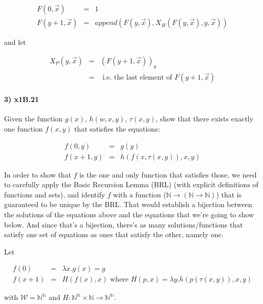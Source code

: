 \documentclass{article}
\begin{document}
\[
\begin{array}{rcl}
  F(0, \overrightarrow{x}) & = & 1 \\
  F(y+1, \overrightarrow{x}) & = & append(F(y,\overrightarrow{x}), X_H(F(y,\overrightarrow{x}), y, \overrightarrow{x}))
\end{array}
\]

and let

\[
\begin{array}{rcl}
  X_P(y, \overrightarrow{x}) & = & (F(y+1,\overrightarrow{x}))_y \\
  & = & \text{ i.e. the last element of } F(y+1,\overrightarrow{x})
\end{array} 
\]



\paragraph{3) x1B.21} Given the function $g(x)$, $h(w,x,y)$, $\tau (x,y)$, show that there exists exactly one function $f(x,y)$ that satisfies the equations:

\[
\begin{array}{rcl}
  f(0,y) & = & g(y) \\
  f(x + 1, y) & = & h(f(x,\tau (x,y)), x, y)
\end{array} 
\]

In order to show that $f$ is the one and only function that satisfies
those, we need to carefully apply the Basic Recursion Lemma (BRL)
(with explicit definitions of functions and sets), and identify $f$
with a function ($\mathbb{N} \rightarrow (\mathbb{N} \rightarrow
\mathbb{N})$) that is guaranteed to be unique by the BRL. That would
establish a bijection between the solutions of the equations above and
the equations that we're going to show below. And since that's a
bijection, there's as many solutions/functions that satisfy one set of
equations as ones that satisfy the other, namely one.

Let

\[
\begin{array}{rcl}
  f(0) & = & \lambda x.g(x) = g \\
  f(x + 1) & = & H(f(x),x) \text{  where } H(p,x) = \lambda y. h(p(\tau (x,y)), x, y)
\end{array} 
\]

with $\mathcal{W} = \mathbb{N}^{\mathbb{N}}$ and $H: \mathbb{N}^{\mathbb{N}} \times \mathbb{N} \rightarrow \mathbb{N}^{\mathbb{N}}$.
\end{document}
